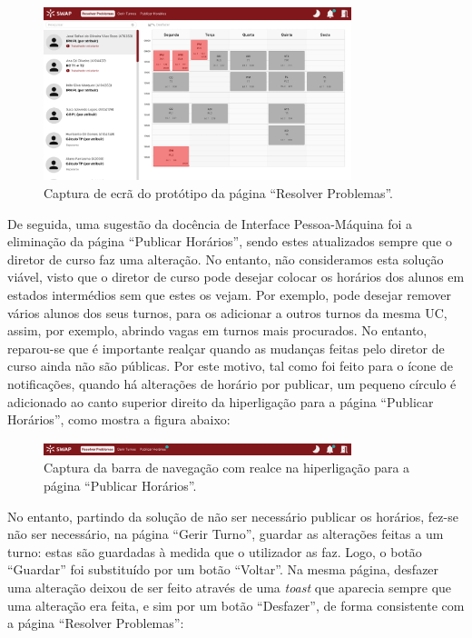 \documentclass[12pt, a4paper]{article}
\begin{document}
\begin{figure}[H]
    \centering
    \includegraphics[width=0.8\textwidth]{res/prototype/resolver-problemas-revisto.png}
    \caption{Captura de ecrã do protótipo da página ``Resolver Problemas''.}
    \label{resolver-problemas-revisto}
\end{figure}

De seguida, uma sugestão da docência de Interface Pessoa-Máquina foi a eliminação da página
``Publicar Horários'', sendo estes atualizados sempre que o diretor de curso faz uma alteração. No
entanto, não consideramos esta solução viável, visto que o diretor de curso pode desejar colocar os
horários dos alunos em estados intermédios sem que estes os vejam. Por exemplo, pode desejar remover
vários alunos dos seus turnos, para os adicionar a outros turnos da mesma UC, assim, por exemplo,
abrindo vagas em turnos mais procurados. No entanto, reparou-se que é importante realçar quando as
mudanças feitas pelo diretor de curso ainda não são públicas. Por este motivo, tal como foi feito
para o ícone de notificações, quando há alterações de horário por publicar, um pequeno círculo é
adicionado ao canto superior direito da hiperligação para a página ``Publicar Horários'', como
mostra a figura abaixo:

\begin{figure}[H]
    \centering
    \includegraphics[width=0.8\textwidth]{res/prototype/mudancas-feitas-publicar-horario.png}
    \caption{
        \onehalfspacing
        Captura da barra de navegação com realce na hiperligação para a página
        ``Publicar Horários''.
    }
    \label{mudancas-feitas-publicar-horario}
\end{figure}

No entanto, partindo da solução de não ser necessário publicar os horários, fez-se não ser
necessário, na página ``Gerir Turno'', guardar as alterações feitas a um turno: estas são guardadas
à medida que o utilizador as faz. Logo, o botão ``Guardar'' foi substituído por um botão ``Voltar''.
Na mesma página, desfazer uma alteração deixou de ser feito através de uma \emph{toast} que aparecia
sempre que uma alteração era feita, e sim por um botão ``Desfazer'', de forma consistente com a
página ``Resolver Problemas'':
\end{document}

